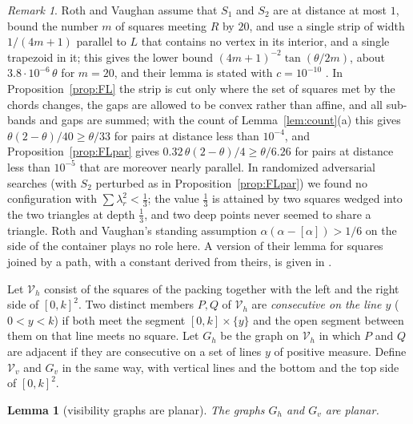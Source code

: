 \documentclass[11pt]{amsart}
\newtheorem{lemma}[theorem]{Lemma}
\theoremstyle{definition}
\theoremstyle{remark}
\newtheorem{remark}[theorem]{Remark}
\begin{document}
\begin{remark}
Roth and Vaughan \cite[\S3, pp.~172--173]{RV} assume that $S_1$ and $S_2$ are at distance at most $1$, bound the number $m$ of
squares meeting $R$ by $20$, and use a single strip of width $1/(4m+1)$ parallel to $L$ that contains no vertex in its
interior, and a single trapezoid in it; this gives the lower bound $(4m+1)^{-2}\tan(\theta/2m)$, about
$3.8\cdot10^{-6}\,\theta$ for $m=20$, and their lemma is stated with $c=10^{-10}$ \cite[p.~171, (3)]{RV}. In Proposition~\ref{prop:FL} the strip is cut
only where the set of squares met by the chords changes, the gaps are allowed to be convex rather than affine, and all
sub-bands and gaps are summed; with the count of Lemma~\ref{lem:count}(a) this gives $\theta(2-\theta)/40\ge\theta/33$ for pairs at
distance less than $10^{-4}$, and Proposition~\ref{prop:FLpar} gives $0.32\,\theta(2-\theta)/4\ge\theta/6.26$ for pairs at distance
less than $10^{-5}$ that are moreover nearly parallel. In randomized adversarial searches (with $S_2$ perturbed as in
Proposition~\ref{prop:FLpar}) we found no configuration with $\sum\lambda_r^2<\frac13$; the value $\frac13$ is attained by two
squares wedged into the two triangles at depth $\frac13$, and two deep points never seemed to share a triangle. Roth and Vaughan's standing
assumption $\alpha(\alpha-[\alpha])>1/6$ on the side of the container plays no role here. A version of their lemma for squares
joined by a path, with a constant derived from theirs, is given in \cite[Section~4]{BuiGood}.
\end{remark}

Let $\mathcal V_h$ consist of the squares of the packing together with the left and the right side of $[0,k]^2$. Two
distinct members $P,Q$ of $\mathcal V_h$ are \emph{consecutive on the line $y$} ($0<y<k$) if both meet the segment
$[0,k]\times\{y\}$ and the open segment between them on that line meets no square. Let $G_h$ be the graph on
$\mathcal V_h$ in which $P$ and $Q$ are adjacent if they are consecutive on a set of lines $y$ of positive measure.
Define $\mathcal V_v$ and $G_v$ in the same way, with vertical lines and the bottom and the top side of $[0,k]^2$.

\begin{lemma}[visibility graphs are planar]\label{lem:planar}
The graphs $G_h$ and $G_v$ are planar.
\end{lemma}
\end{document}
